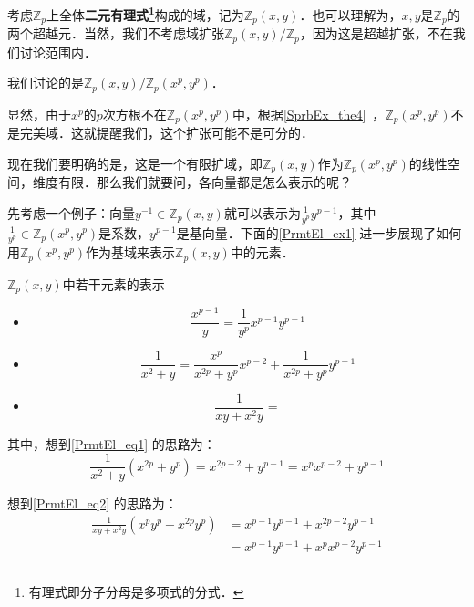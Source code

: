 考虑$\mathbb{Z}_p$上全体\textbf{二元有理式\footnote{有理式即分子分母是多项式的分式．}}构成的域，记为$\mathbb{Z}_p(x, y)$．也可以理解为，$x, y$是$\mathbb{Z}_p$的两个超越元．当然，我们不考虑域扩张$\mathbb{Z}_p(x, y)/\mathbb{Z}_p$，因为这是超越扩张，不在我们讨论范围内．

我们讨论的是$\mathbb{Z}_p(x, y)/\mathbb{Z}_p(x^p, y^p)$．

显然，由于$x^p$的$p$次方根不在$\mathbb{Z}_p(x^p, y^p)$中，根据\autoref{SprbEx_the4}~，$\mathbb{Z}_p(x^p, y^p)$不是完美域．这就提醒我们，这个扩张可能不是可分的．

现在我们要明确的是，这是一个有限扩域，即$\mathbb{Z}_p(x, y)$作为$\mathbb{Z}_p(x^p, y^p)$的线性空间，维度有限．那么我们就要问，各向量都是怎么表示的呢？

先考虑一个例子：向量$y^{-1}\in\mathbb{Z}_p(x, y)$就可以表示为$\frac{1}{y^p}y^{p-1}$，其中$\frac{1}{y^p}\in\mathbb{Z}_p(x^p, y^p)$是系数，$y^{p-1}$是基向量．下面的\autoref{PrmtEl_ex1} 进一步展现了如何用$\mathbb{Z}_p(x^p, y^p)$作为基域来表示$\mathbb{Z}_p(x, y)$中的元素．

\begin{example}{$\mathbb{Z}_p(x, y)$中若干元素的表示}\label{PrmtEl_ex1}


\begin{itemize}

\item 
\begin{equation}
\frac{x^{p-1}}{y} = \frac{1}{y^p}x^{p-1}y^{p-1}
\end{equation}

\item 
\begin{equation}\label{PrmtEl_eq1}
\frac{1}{x^2+y} = \frac{x^p}{x^{2p}+y^p}x^{p-2} + \frac{1}{x^{2p}+y^p}y^{p-1}
\end{equation}

\item 
\begin{equation}\label{PrmtEl_eq2}
\frac{1}{xy+x^2y} = 
\end{equation}

\end{itemize}



其中，想到\autoref{PrmtEl_eq1} 的思路为：
\begin{equation}
\frac{1}{x^2+y}(x^{2p}+y^p) = x^{2p-2}+y^{p-1} = x^px^{p-2}+y^{p-1}
\end{equation}

想到\autoref{PrmtEl_eq2} 的思路为：
\begin{equation}
\begin{aligned}
\frac{1}{xy+x^2y}(x^py^p+x^{2p}y^p) &= x^{p-1}y^{p-1}+x^{2p-2}y^{p-1} \\
&= x^{p-1}y^{p-1}+x^px^{p-2}y^{p-1}
\end{aligned}
\end{equation}

\end{example}

